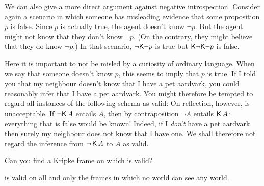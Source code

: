 We can also give a more direct argument against negative introspection. Consider
again a scenario in which someone has misleading evidence that some proposition
$p$ is false. Since $p$ is actually true, the agent doesn't know $\neg p$. But
the agent might not know that they don't know $\neg p$. (On the contrary, they
might believe that they do know $\neg p$.) In that scenario, $\neg\!\operatorname{\mathsf{K}{}}\!\neg p$ is
true but $\operatorname{\mathsf{K}{}}\!\neg\!\operatorname{\mathsf{K}{}}\!\neg p$ is false.

Here it is important to not be misled by a curiosity of ordinary language. When
we say that someone doesn't know $p$, this seems to imply that $p$ is true. If I
told you that my neighbour doesn't know that I have a pet aardvark, you could
reasonably infer that I have a pet aardvark. You might therefore be tempted to
regard all instances of the following schema as valid:
%
%
On reflection, however,  is unacceptable. If $\neg\! \operatorname{\mathsf{K}{}} A$ entails $A$,
then by contraposition $\neg A$ entails $\operatorname{\mathsf{K}{}} A$: everything that is false would
be known! Indeed, if I \emph{don't} have a pet aardvark then surely my neighbour
does not know that I have one. We shall therefore not regard the inference from
$\neg \operatorname{\mathsf{K}{}} A$ to $A$ as valid.

\begin{exercise}
  Can you find a Kripke frame on which  is valid?
\end{exercise}
\begin{solution}
   is valid on all and only the frames in which no world can see any world. 
\end{solution}

